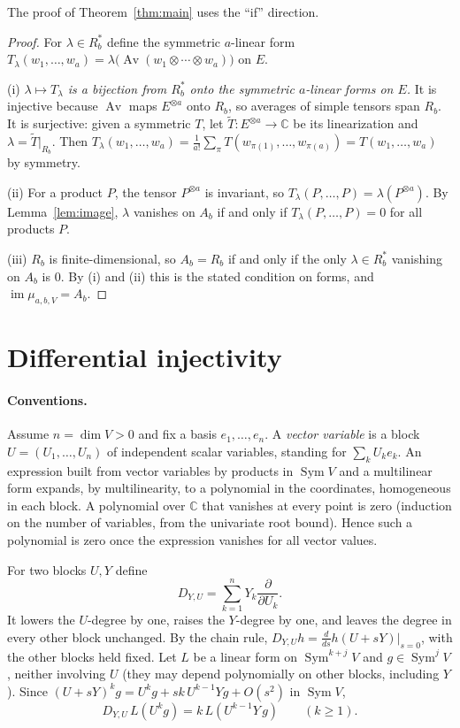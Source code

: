 \documentclass[11pt]{article}
\theoremstyle{remark}
\DeclareMathOperator{\Sym}{Sym}
\DeclareMathOperator{\Av}{Av}
\newcommand{\C}{\mathbb C}
\newcommand{\D}[2]{D_{#1,#2}}
\begin{document}
The proof of Theorem~\ref{thm:main} uses the ``if'' direction.

\begin{proof}
For $\lambda\in R_b^*$ define the symmetric $a$-linear form
$T_\lambda(w_1,\ldots,w_a)=\lambda\bigl(\Av(w_1\otimes\cdots\otimes
w_a)\bigr)$ on $E$.

(i) \emph{$\lambda\mapsto T_\lambda$ is a bijection from $R_b^*$ onto the
symmetric $a$-linear forms on $E$.} It is injective because $\Av$ maps
$E^{\otimes a}$ onto $R_b$, so averages of simple tensors span $R_b$. It is
surjective: given a symmetric $T$, let $\widetilde T:E^{\otimes a}\to\C$ be
its linearization and $\lambda=\widetilde T|_{R_b}$. Then
$T_\lambda(w_1,\ldots,w_a)=\frac1{a!}\sum_\pi
T(w_{\pi(1)},\ldots,w_{\pi(a)})=T(w_1,\ldots,w_a)$ by symmetry.

(ii) For a product $P$, the tensor $P^{\otimes a}$ is invariant, so
$T_\lambda(P,\ldots,P)=\lambda(P^{\otimes a})$. By Lemma~\ref{lem:image},
$\lambda$ vanishes on $A_b$ if and only if $T_\lambda(P,\ldots,P)=0$ for all
products $P$.

(iii) $R_b$ is finite-dimensional, so $A_b=R_b$ if and only if the only
$\lambda\in R_b^*$ vanishing on $A_b$ is $0$. By (i) and (ii) this is the
stated condition on forms, and $\operatorname{im}\mu_{a,b,V}=A_b$.
\end{proof}

\section{Differential injectivity}\label{sec:differential}

\paragraph{Conventions.}
Assume $n=\dim V>0$ and fix a basis $e_1,\ldots,e_n$. A \emph{vector
variable} is a block $U=(U_1,\ldots,U_n)$ of independent scalar variables,
standing for $\sum_kU_ke_k$. An expression built from vector variables by
products in $\Sym V$ and a multilinear form expands, by multilinearity, to a
polynomial in the coordinates, homogeneous in each block. A polynomial over
$\C$ that vanishes at every point is zero (induction on the number of
variables, from the univariate root bound). Hence such a polynomial is zero
once the expression vanishes for all vector values.

For two blocks $U,Y$ define
\[
 \D{Y}{U}=\sum_{k=1}^n Y_k\frac{\partial}{\partial U_k}.
\]
It lowers the $U$-degree by one, raises the $Y$-degree by one, and leaves the
degree in every other block unchanged. By the chain rule,
$\D{Y}{U}h=\frac{d}{ds}h(U+sY)\big|_{s=0}$, with the other blocks held fixed.
Let $L$ be a linear form on $\Sym^{k+j}V$ and $g\in\Sym^jV$, neither
involving $U$ (they may depend polynomially on other blocks, including $Y$).
Since $(U+sY)^kg=U^kg+sk\,U^{k-1}Yg+O(s^2)$ in $\Sym V$,
\begin{equation}\label{eq:insert}
 \D{Y}{U}\,L(U^kg)=k\,L(U^{k-1}Y\,g)\qquad(k\ge1).
\end{equation}
\end{document}
